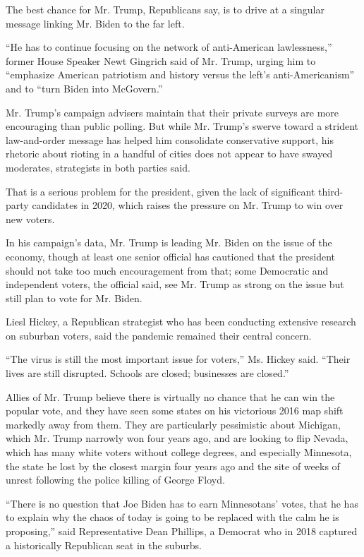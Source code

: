 The best chance for Mr. Trump, Republicans say, is to drive at a
singular message linking Mr. Biden to the far left.

``He has to continue focusing on the network of anti-American
lawlessness,'' former House Speaker Newt Gingrich said of Mr. Trump,
urging him to ``emphasize American patriotism and history versus the
left's anti-Americanism'' and to ``turn Biden into McGovern.''

Mr. Trump's campaign advisers maintain that their private surveys are
more encouraging than public polling. But while Mr. Trump's swerve
toward a strident law-and-order message has helped him consolidate
conservative support, his rhetoric about rioting in a handful of cities
does not appear to have swayed moderates, strategists in both parties
said.

That is a serious problem for the president, given the lack of
significant third-party candidates in 2020, which raises the pressure on
Mr. Trump to win over new voters.

In his campaign's data, Mr. Trump is leading Mr. Biden on the issue of
the economy, though at least one senior official has cautioned that the
president should not take too much encouragement from that; some
Democratic and independent voters, the official said, see Mr. Trump as
strong on the issue but still plan to vote for Mr. Biden.

Liesl Hickey, a Republican strategist who has been conducting extensive
research on suburban voters, said the pandemic remained their central
concern.

``The virus is still the most important issue for voters,'' Ms. Hickey
said. ``Their lives are still disrupted. Schools are closed; businesses
are closed.''

Allies of Mr. Trump believe there is virtually no chance that he can win
the popular vote, and they have seen some states on his victorious 2016
map shift markedly away from them. They are particularly pessimistic
about Michigan, which Mr. Trump narrowly won four years ago, and are
looking to flip Nevada, which has many white voters without college
degrees, and especially Minnesota, the state he lost by the closest
margin four years ago and the site of weeks of unrest following the
police killing of George Floyd.

``There is no question that Joe Biden has to earn Minnesotans' votes,
that he has to explain why the chaos of today is going to be replaced
with the calm he is proposing,'' said Representative Dean Phillips, a
Democrat who in 2018 captured a historically Republican seat in the
suburbs.

